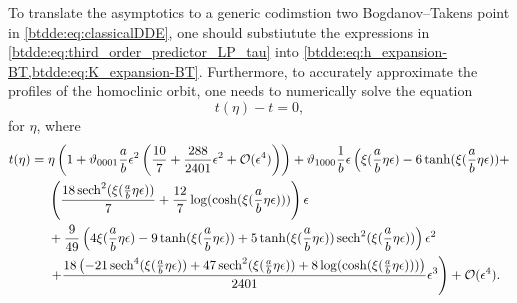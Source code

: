 To translate the asymptotics to a generic codimstion two Bogdanov--Takens point
in \cref{btdde:eq:classicalDDE}, one should substiutute the expressions in
\cref{btdde:eq:third_order_predictor_LP_tau} into \cref{btdde:eq:h_expansion-BT,btdde:eq:K_expansion-BT}.
Furthermore, to accurately approximate the profiles of the homoclinic orbit, one needs to numerically solve
the equation 
\begin{equation*}
    t(\eta) - t = 0,
\end{equation*}
for $\eta$, where
\begin{equation*}
\label{btdde:eq:tOfTau}
\begin{aligned}
    t(\eta) ={}& \eta \left( 1 + \vartheta_{0001}\frac{a}{b}\epsilon^2\left(\frac{10}{7}+ \frac{288}{2401} \epsilon^2 + \mathcal{O}(\epsilon^4) \right) \right) + 
				 \vartheta_{1000} \frac1{b} \epsilon \left( \xi(\frac{a}{b}\eta\epsilon) -6 \tanh (\xi(\frac{a}{b}\eta\epsilon) ) + \right. \\
               &\left( \frac{18 \operatorname{sech}^2(\xi(\frac{a}{b}\eta\epsilon) )}{7}+\frac{12}{7} \log (\cosh (\xi(\frac{a}{b}\eta\epsilon) )) \right) \epsilon \\ 
               & +\frac{9}{49} \left(4 \xi(\frac{a}{b}\eta\epsilon) -9 \tanh (\xi(\frac{a}{b}\eta\epsilon) )+5 \tanh (\xi(\frac{a}{b}\eta\epsilon) ) \operatorname{sech}^2(\xi(\frac{a}{b}\eta\epsilon))\right) \epsilon^2 \\ 
               & \left. +\frac{18 \left(-21 \operatorname{sech}^4(\xi(\frac{a}{b}\eta\epsilon) )+47 \operatorname{sech}^2(\xi(\frac{a}{b}\eta\epsilon) )+8 \log (\cosh (\xi(\frac{a}{b}\eta\epsilon) ))\right)}{2401} \epsilon^3 \right) + \mathcal{O}(\epsilon^4).
\end{aligned}
\end{equation*}

